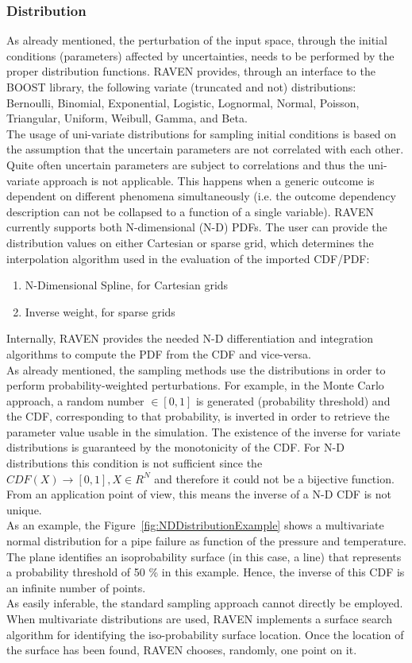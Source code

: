 \subsubsection{Distribution}
As already mentioned, the perturbation of the input space, through the initial conditions (parameters) affected by uncertainties, needs to be performed by the proper distribution functions. RAVEN provides, through an interface to the BOOST library, the following variate (truncated and not) distributions: Bernoulli, Binomial, Exponential, Logistic, Lognormal, Normal, Poisson, Triangular, Uniform, Weibull, Gamma, and Beta.
\\The usage of uni-variate distributions for sampling initial conditions is based on the assumption that the uncertain parameters are not correlated with each other. Quite often uncertain parameters are subject to correlations and thus the uni-variate approach is not applicable. This happens when a generic outcome is dependent on different phenomena simultaneously (i.e. the outcome dependency description can not be collapsed to a function of a single variable). RAVEN currently supports both N-dimensional (N-D) PDFs. The user can provide the distribution values on either Cartesian or sparse grid, which determines the interpolation algorithm used in the evaluation of the imported CDF/PDF:
\begin{enumerate}
\item N-Dimensional Spline, for Cartesian grids
\item Inverse weight, for sparse grids
\end{enumerate}
Internally, RAVEN provides the needed N-D differentiation and integration algorithms to compute the PDF from the CDF and vice-versa.
\\As already mentioned, the sampling methods use the distributions in order to perform probability-weighted perturbations. For example, in the Monte Carlo approach, a random number $\in [0,1]$ is generated (probability threshold) and the CDF, corresponding to that probability, is inverted in order to retrieve the parameter value usable in the simulation. The existence of the inverse for variate distributions is guaranteed by the monotonicity of the CDF. For N-D distributions this condition is not sufficient since the $CDF(X)\longrightarrow [0,1],X \in  R^{N} $ and therefore it could not be a bijective function. From an application point of view, this means the inverse of a N-D CDF is not unique.
\\As an example, the Figure~\ref{fig:NDDistributionExample} shows a multivariate normal distribution for a pipe failure as function of the pressure and temperature. The plane identifies an isoprobability surface (in this case, a line) that represents a probability threshold of 50 \% in this example.  Hence, the inverse of this CDF is an infinite number of points.
 \\As easily inferable, the standard sampling approach cannot directly be employed. When multivariate distributions are used, RAVEN implements a surface search algorithm for identifying the iso-probability surface location. Once the location of the surface has been found, RAVEN chooses, randomly, one point on it.

